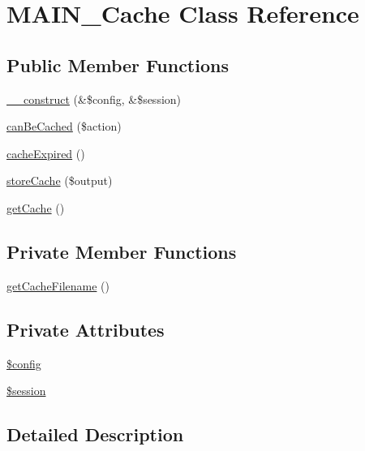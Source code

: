 \hypertarget{classMAIN__Cache}{
\section{MAIN\_\-Cache Class Reference}
\label{d2/d41/classMAIN__Cache}
}
\subsection*{Public Member Functions}
\begin{DoxyCompactItemize}
\item 
\hyperlink{classMAIN__Cache_acf1b5cb6aadded08ca6e99c026ccb002}{\_\-\_\-construct} (\&\$config, \&\$session)
\item 
\hyperlink{classMAIN__Cache_a18001a7118a190476c4ad391f09bc7c1}{canBeCached} (\$action)
\item 
\hyperlink{classMAIN__Cache_a217d6d4359eeb584a532364b9edbba87}{cacheExpired} ()
\item 
\hyperlink{classMAIN__Cache_a146320476b10d9bd545fb492ec929276}{storeCache} (\$output)
\item 
\hyperlink{classMAIN__Cache_a3e92222db37430da9ee40d4ec7263e21}{getCache} ()
\end{DoxyCompactItemize}
\subsection*{Private Member Functions}
\begin{DoxyCompactItemize}
\item 
\hyperlink{classMAIN__Cache_a033ba2adab9e0fed859f88368506c9a1}{getCacheFilename} ()
\end{DoxyCompactItemize}
\subsection*{Private Attributes}
\begin{DoxyCompactItemize}
\item 
\hyperlink{classMAIN__Cache_a9e10bcda14432aaed68c259151ec2070}{\$config}
\item 
\hyperlink{classMAIN__Cache_ad1ffa30f8ad4128b1a1fdaec2d60d7df}{\$session}
\end{DoxyCompactItemize}


\subsection{Detailed Description}


